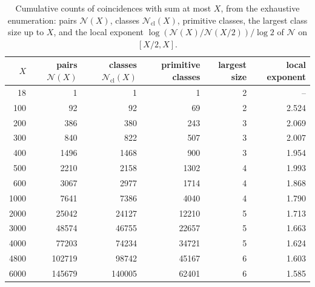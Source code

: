 \documentclass[11pt]{amsart}
\theoremstyle{definition}
\theoremstyle{remark}
\newcommand{\N}{\mathcal{N}}
\newcommand{\Ncl}{\mathcal{N}_{\mathrm{cl}}}
\begin{document}
\begin{table}[t]
\caption{Cumulative counts of coincidences with sum at most $X$, from the exhaustive enumeration: pairs $\N(X)$, classes $\Ncl(X)$, primitive classes, the largest class size up to $X$, and the local exponent $\log(\N(X)/\N(X/2))/\log2$ of $\N$ on $[X/2,X]$.}\label{tab:density}
\centering\small
\begin{tabular}{@{}rrrrrr@{}}
\toprule
$X$ & pairs $\N(X)$ & classes $\Ncl(X)$ & primitive classes & largest size & local exponent\\
\midrule
18 & 1 & 1 & 1 & 2 & -- \\
100 & 92 & 92 & 69 & 2 & 2.524 \\
200 & 386 & 380 & 243 & 3 & 2.069 \\
300 & 840 & 822 & 507 & 3 & 2.007 \\
400 & 1496 & 1468 & 900 & 3 & 1.954 \\
500 & 2210 & 2158 & 1302 & 4 & 1.993 \\
600 & 3067 & 2977 & 1714 & 4 & 1.868 \\
1000 & 7641 & 7386 & 4040 & 4 & 1.790 \\
2000 & 25042 & 24127 & 12210 & 5 & 1.713 \\
3000 & 48574 & 46755 & 22657 & 5 & 1.663 \\
4000 & 77203 & 74234 & 34721 & 5 & 1.624 \\
4800 & 102719 & 98742 & 45167 & 6 & 1.603 \\
6000 & 145679 & 140005 & 62401 & 6 & 1.585 \\
\bottomrule
\end{tabular}
\end{table}
\end{document}
